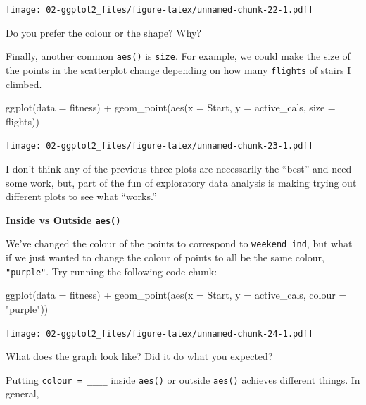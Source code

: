 \documentclass[
]{book}
\newenvironment{Shaded}{\begin{snugshade}}{\end{snugshade}}
\newcommand{\AttributeTok}[1]{\textcolor[rgb]{0.77,0.63,0.00}{#1}}
\newcommand{\FunctionTok}[1]{\textcolor[rgb]{0.00,0.00,0.00}{#1}}
\newcommand{\NormalTok}[1]{#1}
\newcommand{\SpecialCharTok}[1]{\textcolor[rgb]{0.00,0.00,0.00}{#1}}
\newcommand{\StringTok}[1]{\textcolor[rgb]{0.31,0.60,0.02}{#1}}
\begin{document}
\texttt{[image: 02-ggplot2\_files/figure-latex/unnamed-chunk-22-1.pdf]}

Do you prefer the colour or the shape? Why?

Finally, another common \texttt{aes()} is \texttt{size}. For example, we could make the size of the points in the scatterplot change depending on how many \texttt{flights} of stairs I climbed.

\begin{Shaded}
\begin{Highlighting}[]
\FunctionTok{ggplot}\NormalTok{(}\AttributeTok{data =}\NormalTok{ fitness) }\SpecialCharTok{+}
  \FunctionTok{geom\_point}\NormalTok{(}\FunctionTok{aes}\NormalTok{(}\AttributeTok{x =}\NormalTok{ Start, }\AttributeTok{y =}\NormalTok{ active\_cals, }\AttributeTok{size =}\NormalTok{ flights))}
\end{Highlighting}
\end{Shaded}

\texttt{[image: 02-ggplot2\_files/figure-latex/unnamed-chunk-23-1.pdf]}

I don't think any of the previous three plots are necessarily the ``best'' and need some work, but, part of the fun of exploratory data analysis is making trying out different plots to see what ``works.''

\textbf{Inside vs Outside \texttt{aes()}}

We've changed the colour of the points to correspond to \texttt{weekend\_ind}, but what if we just wanted to change the colour of points to all be the same colour, \texttt{"purple"}. Try running the following code chunk:

\begin{Shaded}
\begin{Highlighting}[]
\FunctionTok{ggplot}\NormalTok{(}\AttributeTok{data =}\NormalTok{ fitness) }\SpecialCharTok{+}
  \FunctionTok{geom\_point}\NormalTok{(}\FunctionTok{aes}\NormalTok{(}\AttributeTok{x =}\NormalTok{ Start, }\AttributeTok{y =}\NormalTok{ active\_cals, }\AttributeTok{colour =} \StringTok{"purple"}\NormalTok{))}
\end{Highlighting}
\end{Shaded}

\texttt{[image: 02-ggplot2\_files/figure-latex/unnamed-chunk-24-1.pdf]}

What does the graph look like? Did it do what you expected?

Putting \texttt{colour\ =\ \_\_\_\_} inside \texttt{aes()} or outside \texttt{aes()} achieves different things. In general,
\end{document}
